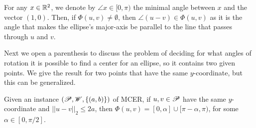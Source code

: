 For any $x\in\mathbb{R}^2$, we denote by $\angle x\in [0, \pi)$ the minimal angle between $x$ and the vector $(1, 0)$. Then, if $\Phi(u,v)\neq\emptyset$, then $\angle(u-v)\in  \Phi(u,v)$ as it is the angle that makes the ellipse's major-axis be parallel to the line that passes through $u$ and $v$. 

Next we open a parenthesis to discuss the problem of deciding for what angles of rotation it is possible to find a center for an ellipse, so it contains two given points. We give the result for two points that have the same $y$-coordinate, but this can be generalized.

\begin{lem}\label{lema:l-function}
	Given an instance $(\mathscr{P}, \mathscr{W}, \{(a, b)\})$ of MCER, if $u, v \in \mathscr{P}$ have the same $y$-coordinate and $||u-v||_2 \le 2a$, then $\Phi(u,v) = [0, \alpha] \cup [\pi - \alpha, \pi)$, for some $\alpha \in [0, \pi/2]$.
\end{lem}


